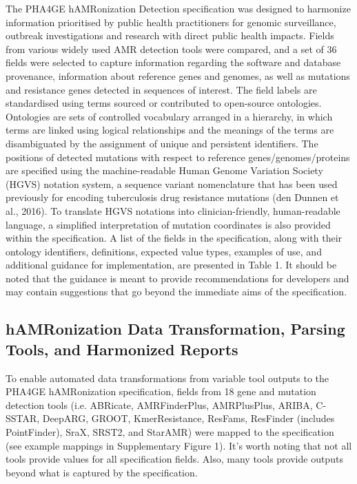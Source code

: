 The PHA4GE hAMRonization Detection specification was designed to harmonize information prioritised by public health practitioners for genomic surveillance, outbreak investigations and research with direct public health impacts. Fields from various widely used AMR detection tools were compared, and a set of 36 fields were selected to capture information regarding the software and database provenance, information about reference genes and genomes, as well as mutations and resistance genes detected in sequences of interest. The field labels are standardised using terms sourced or contributed to open-source ontologies. Ontologies are sets of controlled vocabulary arranged in a hierarchy, in which terms are linked using logical relationships and the meanings of the terms are disambiguated by the assignment of unique and persistent identifiers. The positions of detected mutations with respect to reference genes/genomes/proteins are specified using the machine-readable Human Genome Variation Society (HGVS) notation system, a sequence variant nomenclature that has been used previously for encoding tuberculosis drug resistance mutations (den Dunnen et al., 2016). To translate HGVS notations into clinician-friendly, human-readable language, a simplified interpretation of mutation coordinates is also provided within the specification. A list of the fields in the specification, along with their ontology identifiers, definitions, expected value types, examples of use, and additional guidance for implementation, are presented in Table 1. It should be noted that the guidance is meant to provide recommendations for developers and may contain suggestions that go beyond the immediate aims of the specification.

\subsection{hAMRonization Data Transformation, Parsing Tools, and Harmonized Reports}

To enable automated data transformations from variable tool outputs to the PHA4GE hAMRonization specification, fields from 18 gene and mutation detection tools (i.e. ABRicate, AMRFinderPlus, AMRPlusPlus, ARIBA, C-SSTAR, DeepARG, GROOT, KmerResistance, ResFams, ResFinder (includes PointFinder), SraX, SRST2, and StarAMR) were mapped to the specification (see example mappings in Supplementary Figure 1). It’s worth noting that not all tools provide values for all specification fields. Also, many tools provide outputs beyond what is captured by the specification. 

